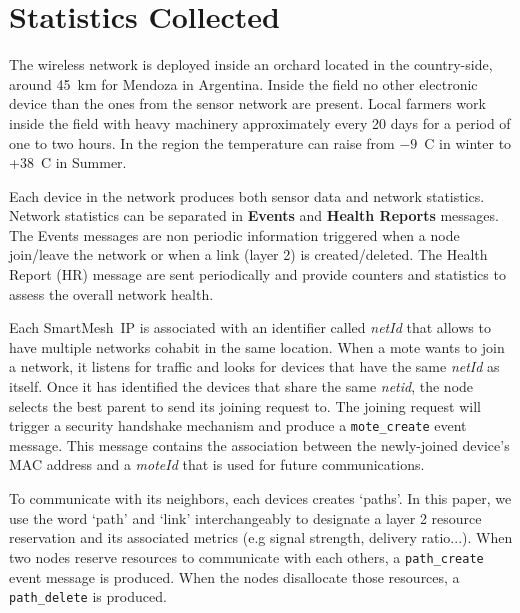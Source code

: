 \documentclass{sig-alternate}
\newcommand{\smip}           {SmartMesh~IP\xspace}
\newcommand{\pathcreate}     {{\tt path\_create}\xspace}
\newcommand{\pathdelete}     {{\tt path\_delete}\xspace}
\newcommand{\motecreate}     {{\tt mote\_create}\xspace}
\begin{document}
\section{Statistics Collected}
\label{sec:collected}


The wireless network is deployed inside an orchard located in the country-side, around 45~km for Mendoza in Argentina.
Inside the field no other electronic device than the ones from the sensor network are present.
Local farmers work inside the field with heavy machinery approximately every 20 days for a period of one to two hours.
In the region the temperature can raise from $-9$~C in winter to +38~C in Summer.


Each device in the network produces both sensor data and network statistics.
Network statistics can be separated in \textbf{Events} and \textbf{Health Reports} messages.
The Events messages are non periodic information triggered when a node join/leave the network or when a link (layer 2) is created/deleted.
The Health Report (HR) message are sent periodically and provide counters and statistics to assess the overall network health.


Each \smip is associated with an identifier called \textit{netId} that allows to have multiple networks cohabit in the same location.
When a mote wants to join a network, it listens for traffic and looks for devices that have the same \textit{netId} as itself.
Once it has identified the devices that share the same \textit{netid}, the node selects the best parent to send its joining request to.
The joining request will trigger a security handshake mechanism and produce a \motecreate event message.
This message contains the association between the newly-joined device's MAC address and a \textit{moteId} that is used for future communications.


To communicate with its neighbors, each devices creates `paths'.
In this paper, we use the word `path' and `link' interchangeably to designate a layer 2 resource reservation and its associated metrics (e.g signal strength, delivery ratio...).
When two nodes reserve resources to communicate with each others, a \pathcreate event message is produced.
When the nodes disallocate those resources, a \pathdelete is produced.
\end{document}
